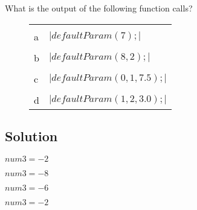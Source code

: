 \documentclass[a4paper, 11pt]{article}
\begin{document}
    What is the output of the following function calls?

    \begin{figure}[H]
      \centering
      \begin{tabular}{|l|l|}
        \hline\\
        a & $|defaultParam(7);|$\\
        \hline\\
        b & $|defaultParam(8, 2);|$\\
        \hline\\
        c & $|defaultParam(0, 1, 7.5);|$\\
        \hline\\
        d & $|defaultParam(1, 2, 3.0);|$ \\
        \hline
      \end{tabular}
    \end{figure}

    \subsection{Solution}
    \begin{enumerate}[label=\alph*.]
      \begin{minipage}{0.45\textwidth}
        \item \begin{mdframed}[style=AnswerFrame]
          $num3=-2$
          \end{mdframed}
        \item \begin{mdframed}[style=AnswerFrame]
          $num3=-8$
          \end{mdframed}
      \end{minipage}\hfill
      \begin{minipage}{.45\textwidth}
        \item \begin{mdframed}[style=AnswerFrame]
          $num3=-6$
          \end{mdframed}
        \item \begin{mdframed}[style=AnswerFrame]
          $num3=-2$
          \end{mdframed}
      \end{minipage}
    \end{enumerate}


  \newpage
  \nocite{textbook}
  \printbibliography[%
    heading=bibintoc,%
    title={Works Consulted}%
  ]{}
  
\end{document}
